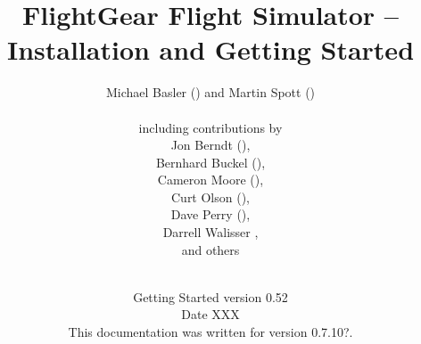 
\thispagestyle{empty}
\title{FlightGear Flight Simulator -- Installation and Getting Started}

\author{
 Michael Basler () and Martin Spott ()\\\\
  including contributions by\\
  Jon Berndt (),\\
  Bernhard Buckel (),\\
  Cameron Moore (),\\
  Curt Olson (),\\
  Dave Perry (),\\
  Darrell Walisser {},\\  
  and others\\
{ \setlength{\fboxsep}{12mm}\setlength{\fboxrule}{0pt}
 \centerline{}}}

\date{Getting Started version 0.52\\
Date XXX\\
This documentation was written for \FlightGear{} version 0.7.10?.}


\maketitle


\tableofcontents


